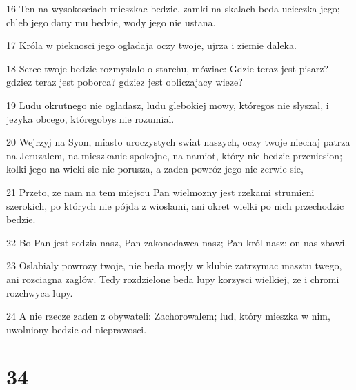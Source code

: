 \par 16 Ten na wysokosciach mieszkac bedzie, zamki na skalach beda ucieczka jego; chleb jego dany mu bedzie, wody jego nie ustana.
\par 17 Króla w pieknosci jego ogladaja oczy twoje, ujrza i ziemie daleka.
\par 18 Serce twoje bedzie rozmyslalo o starchu, mówiac: Gdzie teraz jest pisarz? gdziez teraz jest poborca? gdziez jest obliczajacy wieze?
\par 19 Ludu okrutnego nie ogladasz, ludu glebokiej mowy, któregos nie slyszal, i jezyka obcego, któregobys nie rozumial.
\par 20 Wejrzyj na Syon, miasto uroczystych swiat naszych, oczy twoje niechaj patrza na Jeruzalem, na mieszkanie spokojne, na namiot, który nie bedzie przeniesion; kolki jego na wieki sie nie porusza, a zaden powróz jego nie zerwie sie,
\par 21 Przeto, ze nam na tem miejscu Pan wielmozny jest rzekami strumieni szerokich, po których nie pójda z wioslami, ani okret wielki po nich przechodzic bedzie.
\par 22 Bo Pan jest sedzia nasz, Pan zakonodawca nasz; Pan król nasz; on nas zbawi.
\par 23 Oslabialy powrozy twoje, nie beda mogly w klubie zatrzymac masztu twego, ani rozciagna zaglów. Tedy rozdzielone beda lupy korzysci wielkiej, ze i chromi rozchwyca lupy.
\par 24 A nie rzecze zaden z obywateli: Zachorowalem; lud, który mieszka w nim, uwolniony bedzie od nieprawosci.

\chapter{34}

